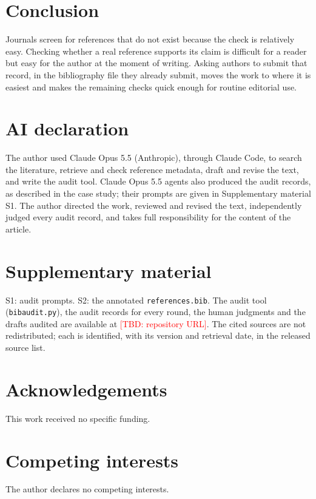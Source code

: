 \documentclass[11pt]{article}
\newcommand{\TBD}[1]{\textcolor{red}{[TBD: #1]}}
\begin{document}
\section{Conclusion}

Journals screen for references that do not exist because the check is relatively easy. Checking whether a real reference supports its claim is difficult for a reader but easy for the author at the moment of writing. Asking authors to submit that record, in the bibliography file they already submit, moves the work to where it is easiest and makes the remaining checks quick enough for routine editorial use.

\section*{AI declaration}

The author used Claude Opus 5.5 (Anthropic), through Claude Code, to search the literature, retrieve and check reference metadata, draft and revise the text, and write the audit tool. Claude Opus 5.5 agents also produced the audit records, as described in the case study; their prompts are given in Supplementary material S1. The author directed the work, reviewed and revised the text, independently judged every audit record, and takes full responsibility for the content of the article.

\section*{Supplementary material}

S1: audit prompts. S2: the annotated \texttt{references.bib}. The audit tool (\texttt{bibaudit.py}), the audit records for every round, the human judgments and the drafts audited are available at \TBD{repository URL}. The cited sources are not redistributed; each is identified, with its version and retrieval date, in the released source list.

\section*{Acknowledgements}

This work received no specific funding.

\section*{Competing interests}

The author declares no competing interests.



\end{document}
